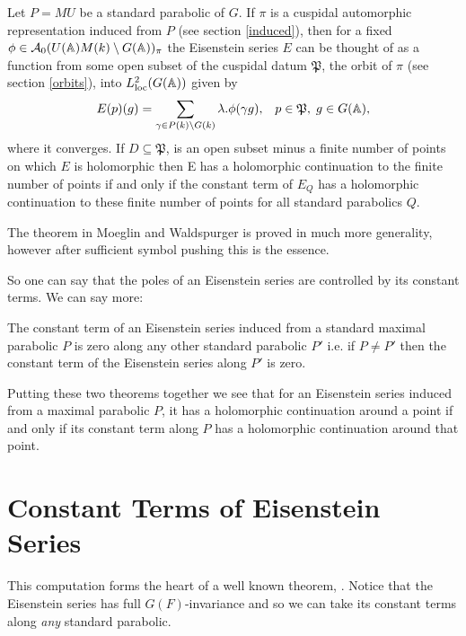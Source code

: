 \begin{Theorem}
		Let \(P = MU\) be a standard parabolic of \(G\). If \(\pi\) is a cuspidal automorphic representation induced from \(P\) (see section \ref{induced}), then for a fixed \(\phi \in\mathcal{A}_0(U(\A)M(k)\setminus G(\A))_\pi \) the Eisenstein series \(E\) can be thought of as a function from some open subset of the cuspidal datum \(\mathfrak{P}\), the orbit of \(\pi\) (see section \ref{orbits}), into \(L^2_{\mathrm{loc}}(G(\A))\) given by 
		\[E(p)(g) = \sum_{\gamma \in P(k)\backslash G(k)} \lambda.\phi(\gamma g), \;\;\; p\in \mathfrak{P},\; g\in G(\A),\]
		where it converges. 
		If \(D\subseteq \mathfrak{P}\), is an open subset minus a finite number of points on which \(E\) is holomorphic then E has a holomorphic continuation to the finite number of points if and only if the constant term of \(E_Q\) has a holomorphic continuation to these finite number of points for all standard parabolics \(Q\).
    \end{Theorem}
    
    \begin{remark}
    	The theorem in Moeglin and Waldspurger is proved in much more generality, however after sufficient symbol pushing this is the essence. 
    \end{remark}
    So one can say that the poles of an Eisenstein series are controlled by its constant terms. We can say more:
    
        
        \begin{theorem}\label{thm:constant_terms}
        	The constant term of an Eisenstein series induced from a standard maximal parabolic \(P\) is zero along any other standard parabolic \(P'\) i.e. if \(P \neq P'\) then the constant term of the Eisenstein series along \(P'\) is zero.
        \end{theorem}
        
        Putting these two theorems together we see that for an Eisenstein series induced from a maximal parabolic \(P\), it has a holomorphic continuation around a point if and only if its constant term along \(P\) has a holomorphic continuation around that point. \label{const_lemma_3}
      
      

\section{Constant Terms of Eisenstein Series}\label{const_eisenstein}
This computation forms the heart of a well known theorem, \cite[Prop 10.4.2]{getzIntroductionAutomorphicRepresentations2024}\cite[II.1.7]{moeglinSpectralDecompositionEisenstein1995}\cite[6.2]{shahidiEisensteinSeriesAutomorphic2010}. Notice that the Eisenstein series has full \(G(F)\)-invariance and so we can take its constant terms along \textit{any} standard parabolic.

